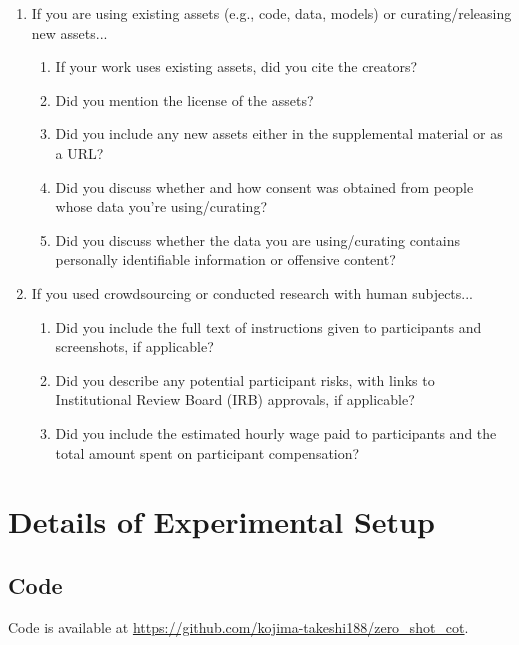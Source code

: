 \documentclass{article}
\newcommand{\kojima}[1]{{\color{red}[{#1} --TK]}}
\begin{document}
\begin{enumerate}
\item If you are using existing assets (e.g., code, data, models) or curating/releasing new assets...
\begin{enumerate}
  \item If your work uses existing assets, did you cite the creators?
    \answerYes{}
  \item Did you mention the license of the assets?
    \answerYes{}
  \item Did you include any new assets either in the supplemental material or as a URL?
    \answerYes{}
  \item Did you discuss whether and how consent was obtained from people whose data you're using/curating?
    \answerYes{}
  \item Did you discuss whether the data you are using/curating contains personally identifiable information or offensive content?
    \answerYes{}
\end{enumerate}


\item If you used crowdsourcing or conducted research with human subjects...
\begin{enumerate}
  \item Did you include the full text of instructions given to participants and screenshots, if applicable?
    \answerNA{}
  \item Did you describe any potential participant risks, with links to Institutional Review Board (IRB) approvals, if applicable?
    \answerNA{}
  \item Did you include the estimated hourly wage paid to participants and the total amount spent on participant compensation?
    \answerNA{}
\end{enumerate}


\end{enumerate}



\clearpage
\appendix

\section{Details of Experimental Setup}
\label{appx:experiment_setup}

\subsection{Code}

Code is available at
\url{https://github.com/kojima-takeshi188/zero_shot_cot}.
\end{document}
